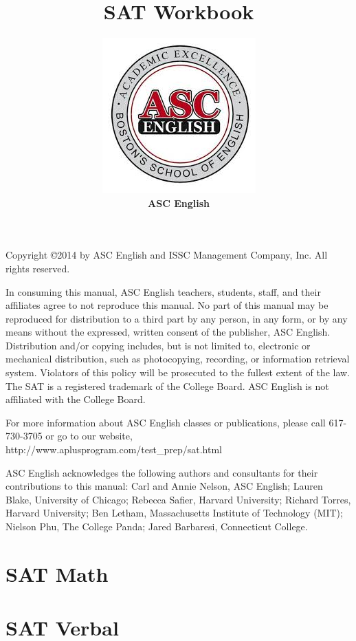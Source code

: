 \documentclass[12pt]{book}
\title{\textbf{\huge SAT Workbook}}
\author{\includegraphics{logo}\\\textbf{\large ASC English}}
\date{}
\begin{document}
\maketitle

\newpage
\vspace*{1em}

\vfill
\begingroup
\fontsize{10pt}{12pt}\selectfont
Copyright \copyright 2014 by ASC English and ISSC Management Company, Inc. All rights reserved.

\bigskip
In consuming this manual, ASC English teachers, students, staff, and their affiliates agree to not reproduce this manual. No part of this manual may be reproduced for distribution to a third part by any person, in any form, or by any means without the expressed, written consent of the publisher, ASC English. Distribution and/or copying includes, but is not limited to, electronic or mechanical distribution, such as photocopying, recording, or information retrieval system. Violators of this policy will be prosecuted to the fullest extent of the law.\\
 
\bigskip
The SAT is a registered trademark of the College Board. ASC English is not affiliated with the College Board. 

\bigskip
For more information about ASC English classes or publications, please call 617-730-3705 or go to our website, http:\//\//www.aplusprogram.com\//test\_prep\//sat.html

\bigskip
ASC English acknowledges the following authors and consultants for their contributions to this manual: Carl and Annie Nelson, ASC English; Lauren Blake, University of Chicago; Rebecca Safier, Harvard University; Richard Torres, Harvard University; Ben Letham, Massachusetts Institute of Technology (MIT); Nielson Phu, The College Panda; Jared Barbaresi, Connecticut College.  
\endgroup

\tableofcontents


\part{SAT Math}








\part{SAT Verbal}








\end{document}
